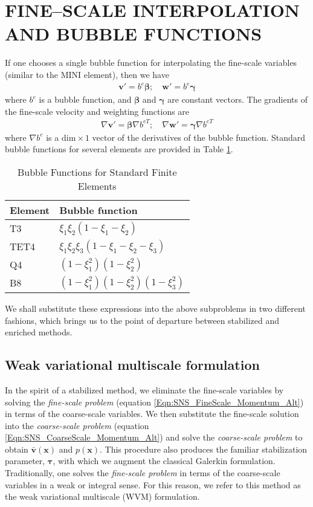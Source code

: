 \documentclass[11pt]{amsart}
\begin{document}
 \section{FINE--SCALE INTERPOLATION AND BUBBLE FUNCTIONS}
If one chooses a single bubble function for interpolating the fine-scale variables (similar to the MINI element), then we have
\begin{align}
 \label{eq:DefineBubbles}
\boldsymbol{v}' = b^e \boldsymbol{\beta}; \quad \boldsymbol{w}' = b^e \boldsymbol{\gamma}
\end{align}
where $b^e$ is a bubble function, and $\boldsymbol{\beta}$ and $\boldsymbol{\gamma}$ 
are constant vectors. 
The gradients of the fine-scale velocity and weighting functions are
\begin{align}
\nabla \boldsymbol{v}' = \boldsymbol{\beta}\nabla b^{eT}; \quad \nabla \boldsymbol{w}' = \boldsymbol{\gamma}\nabla b^{eT}
\end{align}
where $\nabla b^e $ is a $\mathrm{dim} \times 1 $ vector of the derivatives of the bubble function.
Standard bubble functions for several elements are provided in Table \ref{table:BubbleDefs}. 
\begin{table}[htb]
\caption{Bubble Functions for Standard Finite Elements}
\centering
\begin{tabular}{l l}
\hline
Element   & Bubble function \\ 
\hline
T3 & $\xi_1\xi_2(1 - \xi_1 - \xi_2) $ \\ 
TET4 & $\xi_1\xi_2\xi_3(1 - \xi_1 - \xi_2 - \xi_3) $ \\
Q4 & $ (1-\xi_1^2)(1-\xi_2^2)$\\
B8 & $ (1-\xi_1^2)(1-\xi_2^2)(1-\xi_3^2)$ \\
\hline
\end{tabular}
\label{table:BubbleDefs}
\end{table}

We shall substitute these expressions into the above subproblems in two different fashions, which  brings us to the point of departure between stabilized and enriched methods. \subsection{Weak variational multiscale formulation}
In the spirit of a stabilized method, we eliminate the fine-scale variables by solving the \emph{fine-scale problem} (equation \eqref{Eqn:SNS_FineScale_Momentum_Alt}) in terms of the coarse-scale variables.  We then substitute the fine-scale solution into the 
\emph{coarse-scale problem} (equation \eqref{Eqn:SNS_CoarseScale_Momentum_Alt}) and solve 
the \emph{coarse-scale problem} to obtain $\bar{\boldsymbol{v}}(\boldsymbol{x})$ 
and $p(\boldsymbol{x})$. This procedure also produces the familiar stabilization parameter, $\boldsymbol{\tau}$, with which we augment the classical Galerkin formulation.  Traditionally, one solves the \emph{fine-scale problem} in terms of the coarse-scale variables in a weak or integral sense.  For this reason, we refer to this method as the weak variational multiscale (WVM) formulation. 
\end{document}
